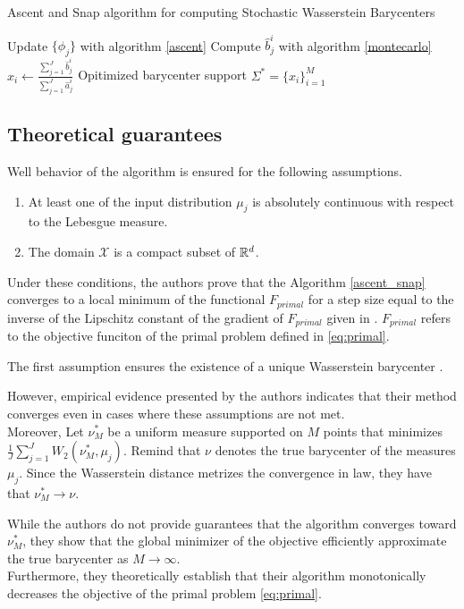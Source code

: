 \begin{algorithm}
    \caption{Ascent and Snap algorithm for computing Stochastic Wasserstein Barycenters}
    \label{ascent_snap}
    \begin{algorithmic}[1]
            \STATE Update $\lbrace \phi_j \rbrace$ with algorithm \ref{ascent} 
            \STATE Compute $\hat{b}_j^i$ with algorithm \ref{montecarlo} 
                \STATE $x_i \gets \frac{\sum_{j=1}^J \hat{b}_j^i }{\sum_{j=1}^{J}\hat{a}_j^i}$ 
            \ENDFOR
        \ENDFOR
        \RETURN Opitimized barycenter support $\Sigma^* = \lbrace x_i \rbrace_{i=1}^M$
    \end{algorithmic}
\end{algorithm}


\subsection{Theoretical guarantees}

Well behavior of the algorithm is ensured for the following assumptions.
\begin{enumerate}
    \item \label{H1} At least one of the input distribution $\mu_j$ is absolutely continuous with respect to the Lebesgue measure.
    \item The domain $\mathcal{X}$ is a compact subset of $\mathbb{R}^d$.
\end{enumerate}

Under these conditions, the authors prove that the Algorithm \ref{ascent_snap} converges to a local minimum of the functional $F_{primal}$ for a step size equal to the inverse of the Lipschitz constant of the gradient of $F_{primal}$ given in \cite{claici_stochastic_2018}. $F_{primal}$ refers to the objective funciton of the primal problem defined in \eqref{eq:primal}. 

The first assumption ensures the existence of a unique Wasserstein barycenter \cite{claici_stochastic_2018}. 

However, empirical evidence presented by the authors indicates that their method converges even in cases where these assumptions are not met. \\ 

Moreover, Let $\nu_M^*$ be a uniform measure supported on $M$ points that minimizes $\frac{1}{J}\sum_{j=1}^{J} W_2(\nu_M^*, \mu_j)$. Remind that $\nu$ denotes the true barycenter of the measures ${\mu_j}$. Since the Wasserstein distance metrizes the convergence in law, they have that $\nu_M^* \rightarrow \nu$.

While the authors do not provide guarantees that the algorithm converges toward $\nu_M^*$, they show that the global minimizer of the objective efficiently approximate the true barycenter as $M \rightarrow \infty$. \\ 

Furthermore, they theoretically establish that their algorithm monotonically decreases the objective of the primal problem \eqref{eq:primal}.

